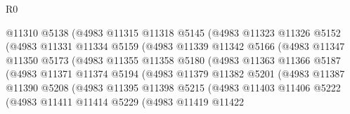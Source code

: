 \begin{lexlean}{R0}
\begin{coremodule}
                          @11310
                          @5138
                          (@4983
                            @11315
                            @11318
                            @5145
                            (@4983
                              @11323
                              @11326
                              @5152
                              (@4983
                                @11331
                                @11334
                                @5159
                                (@4983
                                  @11339
                                  @11342
                                  @5166
                                  (@4983
                                    @11347
                                    @11350
                                    @5173
                                    (@4983
                                      @11355
                                      @11358
                                      @5180
                                      (@4983
                                        @11363
                                        @11366
                                        @5187
                                        (@4983
                                          @11371
                                          @11374
                                          @5194
                                          (@4983
                                            @11379
                                            @11382
                                            @5201
                                            (@4983
                                              @11387
                                              @11390
                                              @5208
                                              (@4983
                                                @11395
                                                @11398
                                                @5215
                                                (@4983
                                                  @11403
                                                  @11406
                                                  @5222
                                                  (@4983
                                                    @11411
                                                    @11414
                                                    @5229
                                                    (@4983
                                                      @11419
                                                      @11422

\end{coremodule}
\end{lexlean}
